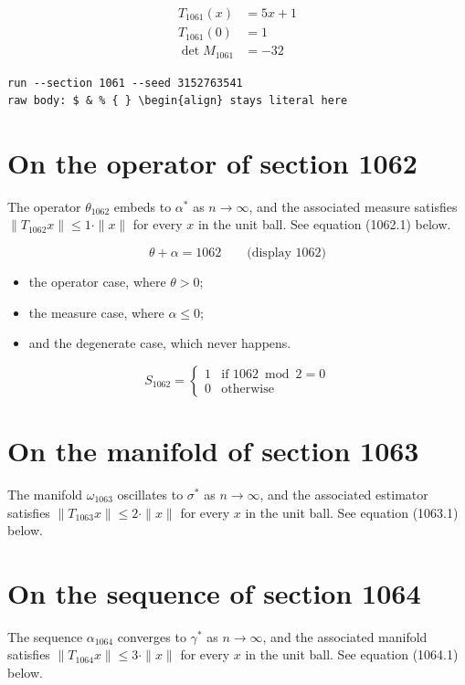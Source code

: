\documentclass{article}
\begin{document}
\begin{align}
T_{1061}(x) &= 5 x + 1 \\
T_{1061}(0) &= 1 \\
\det M_{1061} &= -32
\end{align}

\begin{verbatim}
run --section 1061 --seed 3152763541
raw body: $ & % { } \begin{align} stays literal here
\end{verbatim}

\section{On the operator of section 1062}
The operator $\theta_{1062}$ embeds to $\alpha^{*}$ as $n \to \infty$,
and the associated measure satisfies $\|T_{1062} x\| \leq 1 \cdot \|x\|$
for every $x$ in the unit ball. See equation (1062.1) below.

$$
\theta + \alpha = 1062 \qquad \text{(display 1062)}
$$

\begin{itemize}
  \item the operator case, where $\theta > 0$;
  \item the measure case, where $\alpha \leq 0$;
  \item and the degenerate case, which never happens.
\end{itemize}

\begin{equation}
S_{1062} = \begin{cases} 1 & \text{if } 1062 \bmod 2 = 0 \\ 0 & \text{otherwise} \end{cases}
\end{equation}

\section{On the manifold of section 1063}
The manifold $\omega_{1063}$ oscillates to $\sigma^{*}$ as $n \to \infty$,
and the associated estimator satisfies $\|T_{1063} x\| \leq 2 \cdot \|x\|$
for every $x$ in the unit ball. See equation (1063.1) below.

\section{On the sequence of section 1064}
The sequence $\alpha_{1064}$ converges to $\gamma^{*}$ as $n \to \infty$,
and the associated manifold satisfies $\|T_{1064} x\| \leq 3 \cdot \|x\|$
for every $x$ in the unit ball. See equation (1064.1) below.
\end{document}
